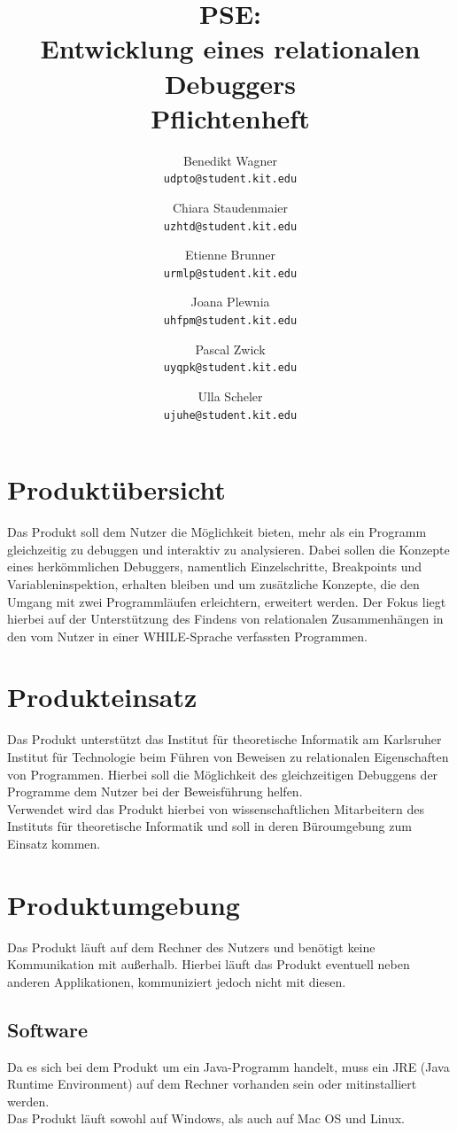\documentclass[parskip=full]{scrartcl}
\title{PSE:\\ Entwicklung eines relationalen Debuggers\\ Pflichtenheft}
\author{
	Benedikt Wagner\\
	\texttt{udpto@student.kit.edu}
	\and Chiara Staudenmaier\\
	\texttt{uzhtd@student.kit.edu}
	\and Etienne Brunner\\
	\texttt{urmlp@student.kit.edu}
	\and Joana Plewnia\\
	\texttt{uhfpm@student.kit.edu} 
	\and Pascal Zwick\\
	\texttt{uyqpk@student.kit.edu}
	\and Ulla Scheler\\
	\texttt{ujuhe@student.kit.edu}
}
\begin{document}
\maketitle
\newpage

\tableofcontents
\newpage

\section{Produktübersicht}
Das Produkt soll dem Nutzer die Möglichkeit bieten, mehr als ein Programm gleichzeitig zu debuggen und interaktiv zu analysieren. Dabei sollen die Konzepte eines herkömmlichen Debuggers, namentlich Einzelschritte, Breakpoints und Variableninspektion, erhalten bleiben und um zusätzliche Konzepte, die den Umgang mit zwei Programmläufen erleichtern, erweitert werden. Der Fokus liegt hierbei auf der Unterstützung des Findens von relationalen Zusammenhängen in den vom Nutzer in einer WHILE-Sprache verfassten Programmen.


\section{Produkteinsatz}
Das Produkt unterstützt das Institut für theoretische Informatik am Karlsruher Institut für Technologie beim Führen von Beweisen zu relationalen Eigenschaften von Programmen. Hierbei soll die Möglichkeit des gleichzeitigen Debuggens der Programme dem Nutzer bei der Beweisführung helfen. \\
Verwendet wird das Produkt hierbei von wissenschaftlichen Mitarbeitern des Instituts für theoretische Informatik und soll in deren Büroumgebung zum Einsatz kommen.

 

\section{Produktumgebung}
Das Produkt läuft auf dem Rechner des Nutzers und benötigt keine Kommunikation mit außerhalb. Hierbei läuft das Produkt eventuell neben anderen Applikationen, kommuniziert jedoch nicht mit diesen.

\subsection{Software}
Da es sich bei dem Produkt um ein Java-Programm handelt, muss ein JRE (Java Runtime Environment) auf dem Rechner vorhanden sein oder mitinstalliert werden. \\
Das Produkt läuft sowohl auf Windows, als auch auf Mac OS und Linux.
\end{document}
